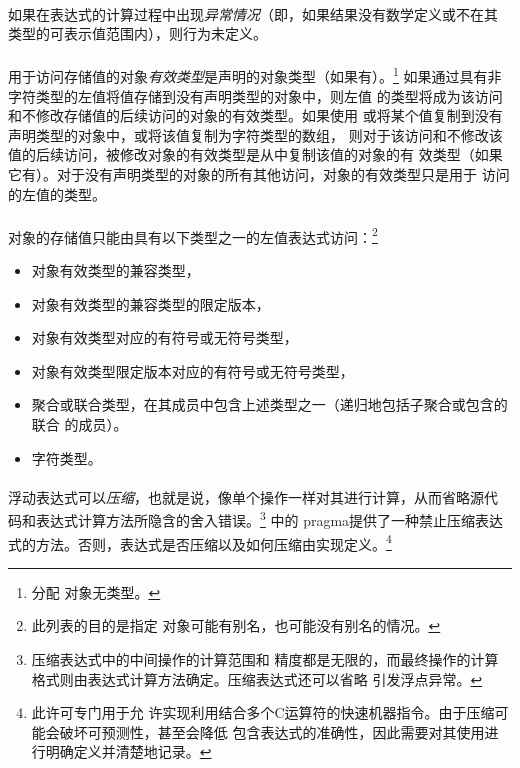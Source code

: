 \paragraph{}
如果在表达式的计算过程中出现\textit{异常情况}（即，如果结果没有数学定义或不在其
类型的可表示值范围内），则行为未定义。

\paragraph{}
用于访问存储值的对象\textit{有效类型}是声明的对象类型（如果有）。\footnote{分配
对象无类型。} 如果通过具有非字符类型的左值将值存储到没有声明类型的对象中，则左值
的类型将成为该访问和不修改存储值的后续访问的对象的有效类型。如果使用
或将某个值复制到没有声明类型的对象中，或将该值复制为字符类型的数组，
则对于该访问和不修改该值的后续访问，被修改对象的有效类型是从中复制该值的对象的有
效类型（如果它有）。对于没有声明类型的对象的所有其他访问，对象的有效类型只是用于
访问的左值的类型。

\paragraph{}
对象的存储值只能由具有以下类型之一的左值表达式访问：\footnote{此列表的目的是指定
对象可能有别名，也可能没有别名的情况。}
\begin{itemize}
  \item{对象有效类型的兼容类型，}
  \item{对象有效类型的兼容类型的限定版本，}
  \item{对象有效类型对应的有符号或无符号类型，}
  \item{对象有效类型限定版本对应的有符号或无符号类型，}
  \item{聚合或联合类型，在其成员中包含上述类型之一（递归地包括子聚合或包含的联合
    的成员）。}
  \item{字符类型。}
\end{itemize}

\paragraph{}
浮动表达式可以\textit{压缩}，也就是说，像单个操作一样对其进行计算，从而省略源代
码和表达式计算方法所隐含的舍入错误。\footnote{压缩表达式中的中间操作的计算范围和
精度都是无限的，而最终操作的计算格式则由表达式计算方法确定。压缩表达式还可以省略
引发浮点异常。} 中的 pragma提供了一种禁止压缩表达
式的方法。否则，表达式是否压缩以及如何压缩由实现定义。\footnote{此许可专门用于允
许实现利用结合多个C运算符的快速机器指令。由于压缩可能会破坏可预测性，甚至会降低
包含表达式的准确性，因此需要对其使用进行明确定义并清楚地记录。}


